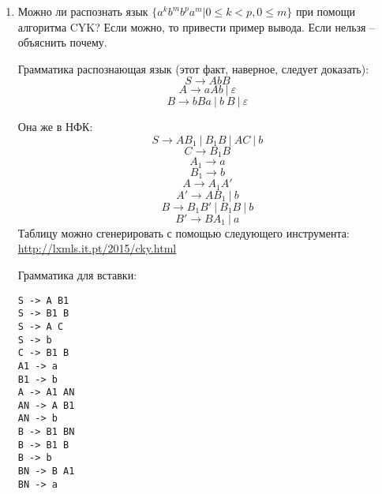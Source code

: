 \documentclass[12pt]{article}
\begin{document}
\bigskip
\begin{enumerate}
 \item Можно ли распознать язык $\{a^kb^mb^pa^m | 0 \leq k < p, 0 \leq m\}$ при помощи алгоритма CYK? 
    Если можно, то привести пример вывода.
    Если нельзя -- объяснить почему.

        Грамматика распознающая язык (этот факт, наверное, следует доказать):
        \[
            S \rightarrow A b B
        \]
        \[
            A \rightarrow a A b~|~\varepsilon 
        \]
        \[
            B \rightarrow b B a~|~b~B~|~\varepsilon
        \]

        Она же в НФК:
        \[
            S \rightarrow A B_1~|~B_1B~|~A C~|~b
        \]
        \[
            C \rightarrow B_1 B
        \]
        \[
            A_1 \rightarrow a
        \]
        \[
            B_1 \rightarrow b
        \]
        \[
            A \rightarrow A_1 A'
        \]
        \[
            A' \rightarrow A B_1~|~b
        \]
        \[
            B \rightarrow B_1 B'~|~B_1 B~|~b
        \]
        \[
            B' \rightarrow B A_1~|~a
        \]
        Таблицу можно сгенерировать с помощью следующего инструмента: \\ \url{http://lxmls.it.pt/2015/cky.html} 

        Грамматика для вставки:

\begin{verbatim}
S -> A B1
S -> B1 B
S -> A C
S -> b
C -> B1 B
A1 -> a
B1 -> b
A -> A1 AN
AN -> A B1
AN -> b
B -> B1 BN
B -> B1 B
B -> b
BN -> B A1
BN -> a
\end{verbatim}

\end{enumerate}
\end{document}
